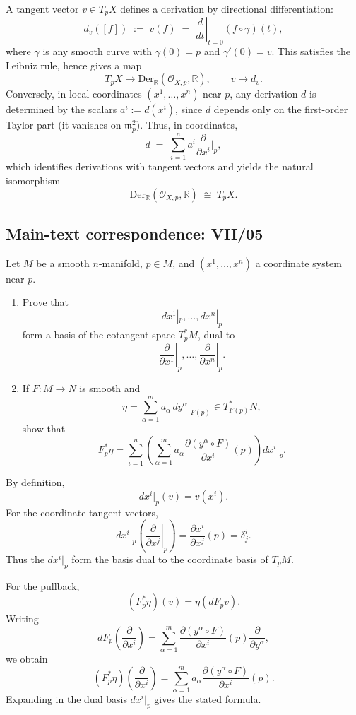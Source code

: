 \begin{solution}
A tangent vector $v\in T_pX$ defines a derivation by directional differentiation:
\[
d_v([f]) \;:=\; v(f) \;=\; \left.\frac{d}{dt}\right|_{t=0} (f\circ \gamma)(t),
\]
where $\gamma$ is any smooth curve with $\gamma(0)=p$ and $\gamma'(0)=v$.
This satisfies the Leibniz rule, hence gives a map
\[
T_pX \longrightarrow \mathrm{Der}_{\mathbb{R}}(\mathcal{O}_{X,p},\mathbb{R}),\qquad v\mapsto d_v.
\]
Conversely, in local coordinates $(x^1,\dots,x^n)$ near $p$, any derivation $d$ is determined by the scalars
$a^i:=d(x^i)$, since $d$ depends only on the first-order Taylor part (it vanishes on $\mathfrak{m}_p^2$).
Thus, in coordinates,
\[
d \;=\; \sum_{i=1}^n a^i \frac{\partial}{\partial x^i}\Big|_p,
\]
which identifies derivations with tangent vectors and yields the natural isomorphism
\[
\mathrm{Der}_{\mathbb{R}}(\mathcal{O}_{X,p},\mathbb{R}) \;\cong\; T_pX.
\]
	
	
	
	
\end{solution}

\subsection*{Main-text correspondence: VII/05}

\begin{problem}
\label{prob:cp-vii-0017}
Let \(M\) be a smooth \(n\)-manifold, \(p\in M\), and
\((x^1,\ldots,x^n)\) a coordinate system near \(p\).

\begin{enumerate}
\item Prove that
\[
dx^1|_p,\ldots,dx^n|_p
\]
form a basis of the cotangent space \(T_p^*M\), dual to
\[
\left.\frac{\partial}{\partial x^1}\right|_p,\ldots,
\left.\frac{\partial}{\partial x^n}\right|_p .
\]
\item If \(F:M\to N\) is smooth and
\[
\eta=\sum_{\alpha=1}^m a_\alpha\,dy^\alpha|_{F(p)}
\in T_{F(p)}^*N,
\]
show that
\[
F_p^*\eta
=
\sum_{i=1}^n
\left(
\sum_{\alpha=1}^m
a_\alpha
\frac{\partial (y^\alpha\circ F)}{\partial x^i}(p)
\right)
dx^i|_p .
\]
\end{enumerate}
\end{problem}

\begin{solution}
By definition,
\[
dx^i|_p(v)=v(x^i).
\]
For the coordinate tangent vectors,
\[
dx^i|_p\!\left(
\left.\frac{\partial}{\partial x^j}\right|_p
\right)
=
\frac{\partial x^i}{\partial x^j}(p)
=
\delta^i_j.
\]
Thus the \(dx^i|_p\) form the basis dual to the coordinate basis of
\(T_pM\).

For the pullback,
\[
(F_p^*\eta)(v)=\eta(dF_pv).
\]
Writing
\[
dF_p\!\left(\frac{\partial}{\partial x^i}\right)
=
\sum_{\alpha=1}^m
\frac{\partial(y^\alpha\circ F)}{\partial x^i}(p)
\frac{\partial}{\partial y^\alpha},
\]
we obtain
\[
(F_p^*\eta)\!\left(\frac{\partial}{\partial x^i}\right)
=
\sum_{\alpha=1}^m
a_\alpha
\frac{\partial(y^\alpha\circ F)}{\partial x^i}(p).
\]
Expanding in the dual basis \(dx^i|_p\) gives the stated formula.
\end{solution}

